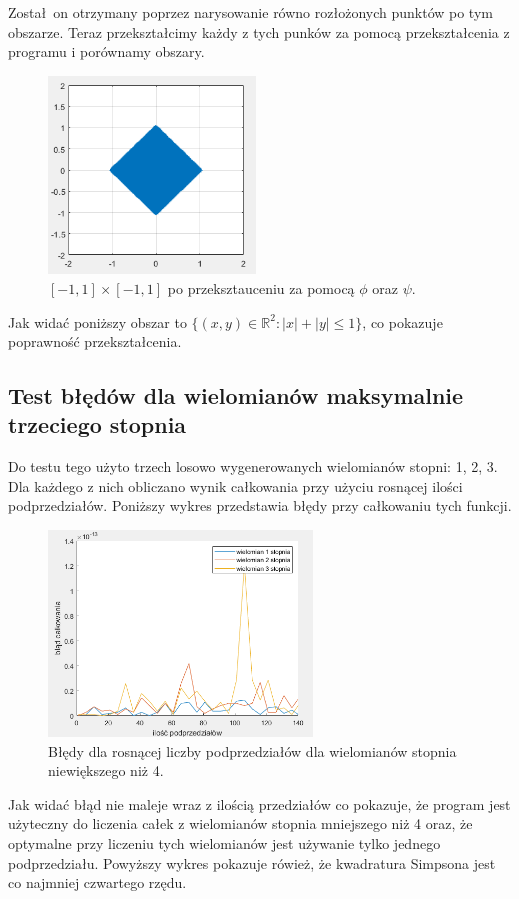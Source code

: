 \documentclass[12pt]{article}
\begin{document}
Zosta\l \ on otrzymany poprzez narysowanie r\'owno roz\l o\.zonych punkt\'ow po tym obszarze.
Teraz przekszta\l cimy ka\.zdy z tych punk\'ow za pomocą przekszta\l cenia z programu i por\'ownamy obszary.\\
\begin{figure}[H]
    \centering
    \includegraphics[width=5.5cm]{romb.png}
    \caption{$[-1,1]\times[-1,1]$ po przeksztauceniu za pomocą $\phi $ oraz $\psi$.}
\end{figure}

Jak wida\'c poni\.zszy obszar to $\{(x,y) \in \mathbb R^2 : |x| + |y| \leq 1\}$, co pokazuje poprawno\'s\'c
przekszta\l cenia.
\subsection{Test b\l ęd\'ow dla wielomian\'ow maksymalnie trzeciego stopnia}
Do testu tego u\.zyto trzech losowo wygenerowanych wielomian\'ow stopni: 1, 2, 3.
Dla ka\.zdego z nich obliczano wynik ca\l kowania przy u\.zyciu rosnącej ilo\'sci podprzedzia\l \'ow.
Poni\.zszy wykres przedstawia b\l ędy przy ca\l kowaniu tych funkcji.\\
\begin{figure}[H]
    \centering
    \includegraphics[width=7cm]{less_4.png}
    \caption{B\l ędy dla rosnącej liczby podprzedzia\l \'ow dla wielomian\'ow 
    stopnia niewiększego ni\.z 4.}
\end{figure}
Jak wida\'c b\l ąd nie maleje wraz z ilo\'scią przedzia\l \'ow co pokazuje,
\.ze program jest u\.zyteczny do liczenia ca\l ek z wielomian\'ow stopnia
mniejszego ni\.z 4 oraz, \.ze optymalne przy liczeniu tych wielomian\'ow
jest u\.zywanie tylko jednego podprzedzia\l u. Powy\.zszy wykres pokazuje 
r\'owie\.z, \.ze kwadratura Simpsona jest co najmniej czwartego rzędu.
\newpage
\end{document}
